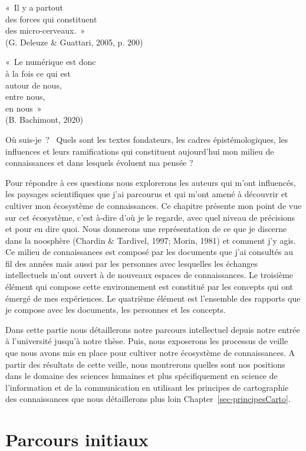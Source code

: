 \documentclass[
  a4paper,
  DIV=11,
  numbers=noendperiod]{scrreprt}
\begin{document}
\label{exergue-Positionnements1}
«~Il y a partout\\
des forces qui constituent\\
des micro-cerveaux.~»\\
(G. Deleuze \& Guattari, 2005, p. 200)

\label{exergue-Positionnements2}
«~Le numérique est donc\\
à la fois ce qui est\\
autour de nous,\\
entre nous,\\
en nous~»\\
(B. Bachimont, 2020)

Où suis-je~? ~Quels sont les textes fondateurs, les cadres
épistémologiques, les influences et leurs ramifications qui constituent
aujourd'hui mon milieu de connaissances et dans lesquels évoluent ma
pensée ?

Pour répondre à ces questions nous explorerons les auteurs qui m'ont
influencés, les paysages scientifiques que j'ai parcourus et qui m'ont
amené à découvrir et cultiver mon écosystème de connaissances. Ce
chapitre présente mon point de vue sur cet écosystème, c'est à-dire d'où
je le regarde, avec quel niveau de précisions et pour en dire quoi. Nous
donnerons une représentation de ce que je discerne dans la noosphère
(Chardin \& Tardivel, 1997; Morin, 1981) et comment j'y agis. Ce milieu
de connaissances est composé par les documents que j'ai consultés au fil
des années mais aussi par les personnes avec lesquelles les échanges
intellectuels m'ont ouvert à de nouveaux espaces de connaissances. Le
troisième élément qui compose cette environnement est constitué par les
concepts qui ont émergé de mes expériences. Le quatrième élément est
l'ensemble des rapports que je compose avec les documents, les personnes
et les concepts.

Dans cette partie nous détaillerons notre parcours intellectuel depuis
notre entrée à l'université jusqu'à notre thèse. Puis, nous exposerons
les processus de veille que nous avons mis en place pour cultiver notre
écosystème de connaissances. A partir des résultats de cette veille,
nous montrerons quelles sont nos positions dans le domaine des sciences
humaines et plus spécifiquement en science de l'information et de la
communication en utilisant les principes de cartographie des
connaissances que nous détaillerons plus loin
Chapter~\ref{sec-principesCarto}.

\section{Parcours initiaux}\label{sec-parcoursinitiaux}
\end{document}
